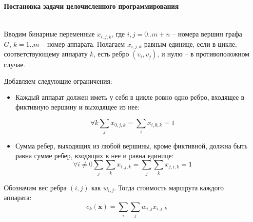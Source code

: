 \documentclass[a4paper,14pt,russian]{article}
\begin{document}


\paragraph{Постановка задачи целочисленного программирования} ~\\

Вводим бинарные переменные $x_{i,j,k}$, где $i, j = 0..m+n$ -- номера вершин графа $G$, $k = 1..m$ -- номер аппарата. Полагаем $x_{i,j,k}$ равным единице, если в цикле, соответствующему аппарату $k$, есть ребро $(v_i, v_j)$, и нулю -- в противоположном случае.

Добавляем следующие ограничения:
\begin{itemize}

\item Каждый аппарат должен иметь у себя в цикле ровно одно ребро, входящее в фиктивную вершину и выходящее из нее:


\begin{equation} \label{lin1}
\forall k \displaystyle\sum_j x_{0,j,k} = \displaystyle\sum_i x_{i,0,k} = 1
\end{equation}

\item Сумма ребер, выходящих из любой вершины, кроме фиктивной, должна быть равна сумме ребер, входящих в нее и равна единице:
\begin{equation}
\forall i \neq 0 \displaystyle\sum_j \displaystyle\sum_k x_{i,j,k} = \displaystyle\sum_j \displaystyle\sum_k x_{j,i,k} = 1
\end{equation}

\end{itemize}

Обозначим вес ребра $(i, j)$ как $w_{i,j}$. Тогда стоимость маршрута каждого аппарата:
\begin{equation}
c_k(\mathbf{x}) = \displaystyle\sum_i \displaystyle\sum_j w_{i,j} x_{i,j,k}
\end{equation}

\end{document}
